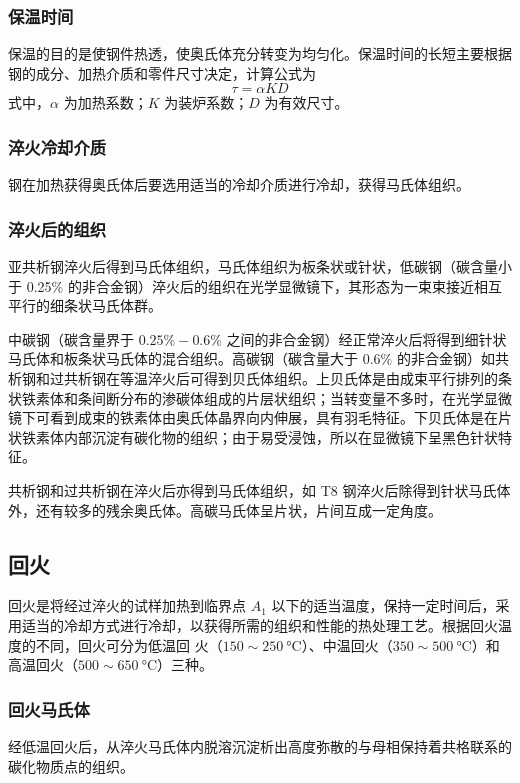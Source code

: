 \documentclass[a4paper,utf8]{article}
\begin{document}
        \subsubsection{保温时间}
            保温的目的是使钢件热透，使奥氏体充分转变为均匀化。保温时间的长短主要根据钢的成分、加热介质和零件尺寸决定，计算公式为
            \begin{equation}
                \tau=\alpha KD
            \end{equation}
            式中，$\alpha$ 为加热系数；$K$ 为装炉系数；$D$ 为有效尺寸。
        \subsubsection{淬火冷却介质}
            钢在加热获得奥氏体后要选用适当的冷却介质进行冷却，获得马氏体组织。
        \subsubsection{淬火后的组织}
            亚共析钢淬火后得到马氏体组织，马氏体组织为板条状或针状，低碳钢（碳含量小于 0.25\% 的非合金钢）淬火后的组织在光学显微镜下，其形态为一束束接近相互平行的细条状马氏体群。\par
            中碳钢（碳含量界于 $0.25\%-0.6\%$ 之间的非合金钢）经正常淬火后将得到细针状马氏体和板条状马氏体的混合组织。高碳钢（碳含量大于 $0.6\%$ 的非合金钢）如共析钢和过共析钢在等温淬火后可得到贝氏体组织。上贝氏体是由成束平行排列的条状铁素体和条间断分布的渗碳体组成的片层状组织；当转变量不多时，在光学显微镜下可看到成束的铁素体由奥氏体晶界向内伸展，具有羽毛特征。下贝氏体是在片状铁素体内部沉淀有碳化物的组织；由于易受浸蚀，所以在显微镜下呈黑色针状特征。\par
            共析钢和过共析钢在淬火后亦得到马氏体组织，如 T8 钢淬火后除得到针状马氏体外，还有较多的残余奥氏体。高碳马氏体呈片状，片间互成一定角度。
    \subsection{回火}
        回火是将经过淬火的试样加热到临界点 $A_1$ 以下的适当温度，保持一定时间后，采用适当的冷却方式进行冷却，以获得所需的组织和性能的热处理工艺。根据回火温度的不同，回火可分为低温回
        火（$150 \sim 250~\unit{\degreeCelsius}$）、中温回火（$350 \sim 500~\unit{\degreeCelsius}$）和高温回火（$500 \sim 650~\unit{\degreeCelsius}$）三种。
            \subsubsection{回火马氏体}
                经低温回火后，从淬火马氏体内脱溶沉淀析出高度弥散的与母相保持着共格联系的碳化物质点的组织。
\end{document}
